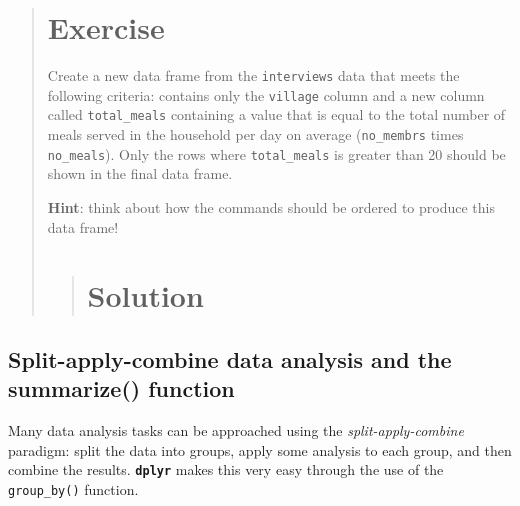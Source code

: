 \documentclass[]{book}
\newenvironment{Shaded}{\begin{snugshade}}{\end{snugshade}}
\newcommand{\KeywordTok}[1]{\textcolor[rgb]{0.13,0.29,0.53}{\textbf{#1}}}
\newcommand{\DataTypeTok}[1]{\textcolor[rgb]{0.13,0.29,0.53}{#1}}
\newcommand{\DecValTok}[1]{\textcolor[rgb]{0.00,0.00,0.81}{#1}}
\newcommand{\StringTok}[1]{\textcolor[rgb]{0.31,0.60,0.02}{#1}}
\newcommand{\OperatorTok}[1]{\textcolor[rgb]{0.81,0.36,0.00}{\textbf{#1}}}
\newcommand{\NormalTok}[1]{#1}
\begin{document}
\begin{quote}
\section{Exercise}\label{exercise-8}

Create a new data frame from the \texttt{interviews} data that meets the
following criteria: contains only the \texttt{village} column and a new
column called \texttt{total\_meals} containing a value that is equal to
the total number of meals served in the household per day on average
(\texttt{no\_membrs} times \texttt{no\_meals}). Only the rows where
\texttt{total\_meals} is greater than 20 should be shown in the final
data frame.

\textbf{Hint}: think about how the commands should be ordered to produce
this data frame!

\begin{quote}
\section{Solution}\label{solution-7}

\begin{Shaded}
\end{Shaded}
\end{quote}
\end{quote}

\subsection{Split-apply-combine data analysis and the summarize()
function}\label{split-apply-combine-data-analysis-and-the-summarize-function}

Many data analysis tasks can be approached using the
\emph{split-apply-combine} paradigm: split the data into groups, apply
some analysis to each group, and then combine the results.
\textbf{\texttt{dplyr}} makes this very easy through the use of the
\texttt{group\_by()} function.
\end{document}
